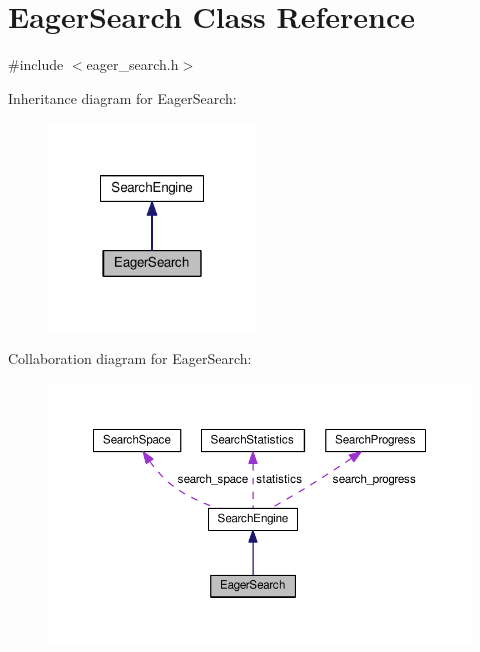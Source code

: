 \hypertarget{classEagerSearch}{\section{Eager\-Search Class Reference}
\label{classEagerSearch}
}


{\ttfamily \#include $<$eager\-\_\-search.\-h$>$}



Inheritance diagram for Eager\-Search\-:
\nopagebreak
\begin{figure}[H]
\begin{center}
\leavevmode
\includegraphics[width=156pt]{classEagerSearch__inherit__graph}
\end{center}
\end{figure}


Collaboration diagram for Eager\-Search\-:
\nopagebreak
\begin{figure}[H]
\begin{center}
\leavevmode
\includegraphics[width=350pt]{classEagerSearch__coll__graph}
\end{center}
\end{figure}
